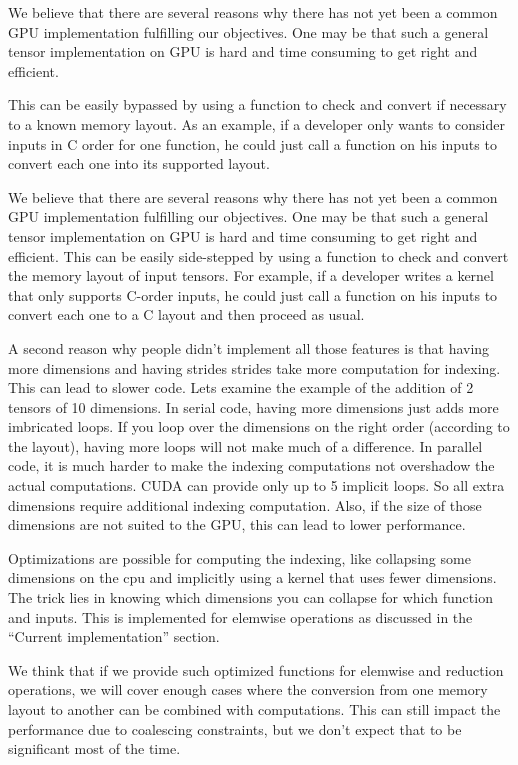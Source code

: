 \documentclass{article} %
\begin{document}
We believe that there are several reasons why there has not yet been a common GPU implementation fulfilling our objectives.
One may be that such a general tensor implementation on GPU is hard and time consuming to get right and efficient.

This can be easily bypassed by using
a function to check and convert %
if necessary to a known memory layout.
As an example, if a developer only wants to consider inputs in C order for one function, he could just call a function on his inputs to
convert each one into its supported layout. %

We believe that there are several reasons why there has not yet been a common GPU implementation fulfilling our objectives.
One may be that such a general tensor implementation on GPU is hard and time consuming to get right and efficient.
This can be easily side-stepped by using a function to check and convert the memory layout of input tensors.
For example, if a developer writes a kernel that only supports C-order inputs, he could just call a function on his inputs to convert each one to a C layout and then proceed as usual.

A second reason why people didn't implement all those features is
that having more dimensions and having strides strides take more
computation for indexing. This can lead to slower code. Lets examine the example of the addition of 2 tensors of 10 dimensions.
In serial code, having more dimensions just adds more imbricated loops.  
If you loop over the dimensions on the right order (according to the layout), having more loops will not make much of a difference.
In parallel code, it is much harder to make the indexing computations not overshadow the actual computations. 
CUDA can provide only up to 5 implicit loops. So all extra dimensions require
additional indexing computation. Also, if the size of those dimensions
are not suited to the GPU, this can lead to lower performance.

Optimizations are possible for computing the indexing, like
collapsing some dimensions on the cpu and implicitly using a kernel
that uses fewer dimensions. The trick lies in knowing which 
dimensions you can collapse for which function and inputs. This is
implemented for elemwise operations as discussed in the ``Current
implementation'' section.

We think that if we provide such optimized functions for elemwise and
reduction operations, we will cover enough cases where the conversion from
one memory layout to another can be combined with computations. This
can still impact the performance due to coalescing constraints, but we
don't expect that to be significant most of the time.
\end{document}
